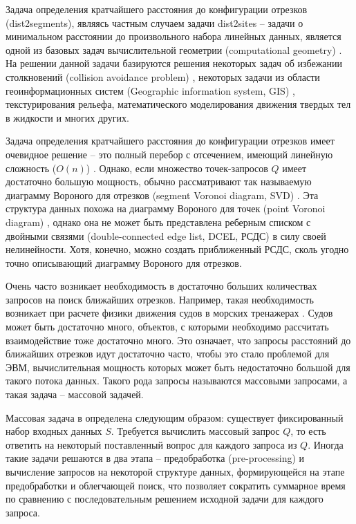 \startprefacepage

Задача определения кратчайшего расстояния до конфигурации отрезков
(dist2segments), являясь частным случаем задачи dist2sites -- задачи о
минимальном расстоянии до произвольного набора линейных данных,
является одной из базовых задач вычислительной геометрии (computational
geometry) \cite{PrSh}. На решении данной задачи базируются решения некоторых задач
об избежании столкновений (collision avoidance problem) \cite{MarNav}, некоторых задачи
из области геоинформационных систем (Geographic information system, GIS) \cite{CGinGIS},
текстурирования рельефа, математического моделирования движения твердых
тел в жидкости и многих других.

Задача определения кратчайшего расстояния до конфигурации
отрезков имеет очевидное решение -- это полный
перебор с отсечением, имеющий линейную сложность ($O(n)$) \cite{DnCG}. Однако, если
множество точек-запросов $Q$ имеет достаточно большую мощность, обычно
рассматривают так называемую диаграмму Вороного для отрезков (segment
Voronoi diagram, SVD) \cite{PrSh, CGAL}. Эта структура данных похожа на диаграмму
Вороного для точек (point Voronoi diagram) \cite{PrSh, CGAL}, однако она не может быть
представлена реберным списком с двойными связями (double-connected edge
list, DCEL, РСДС) \cite{PrSh, CGAL} в силу своей нелинейности. Хотя, конечно, можно
создать приближенный РСДС, сколь угодно точно описывающий диаграмму
Вороного для отрезков.

Очень часто возникает необходимость в достаточно
больших количествах запросов на поиск ближайших отрезков.
Например, такая необходимость возникает при расчете физики движения судов в морских
тренажерах \cite{MarNav}. Судов может быть достаточно много, объектов, с которыми
необходимо рассчитать взаимодействие тоже достаточно много. Это означает,
что запросы расстояний до ближайших отрезков идут достаточно часто, чтобы это стало проблемой
для ЭВМ, вычислительная мощность которых может быть недостаточно
большой для такого потока данных. Такого рода запросы называются
массовыми запросами, а такая задача -- массовой задачей.

Массовая задача в \cite{PrSh} определена следующим образом: существует
фиксированный набор входных данных $S$. Требуется вычислить массовый
запрос $Q$, то есть ответить на некоторый поставленный вопрос для каждого
запроса из $Q$. Иногда такие задачи решаются в два этапа -- предобработка 
(pre-processing) и вычисление запросов на некоторой структуре данных,
формирующейся на этапе предобработки и облегчающей поиск, что позволяет
сократить суммарное время по сравнению с последовательным решением
исходной задачи для каждого запроса.

